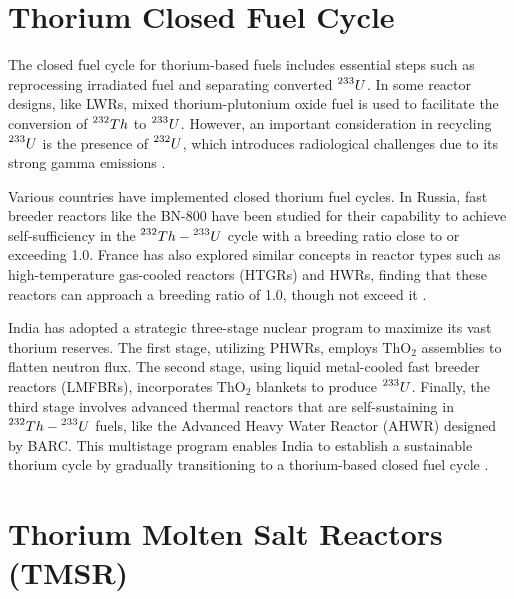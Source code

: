 \section{Thorium Closed Fuel Cycle}

The closed fuel cycle for thorium-based fuels includes essential steps such as reprocessing irradiated fuel and separating converted \(\prescript{233}{}{U}\). In some reactor designs, like LWRs, mixed thorium-plutonium oxide fuel is used to facilitate the conversion of \(\prescript{232}{}{Th}\) to \(\prescript{233}{}{U}\). However, an important consideration in recycling \(\prescript{233}{}{U}\) is the presence of \(\prescript{232}{}{U}\), which introduces radiological challenges due to its strong gamma emissions \cite{IAEA_Th_Potential}.

Various countries have implemented closed thorium fuel cycles. In Russia, fast breeder reactors like the BN-800 have been studied for their capability to achieve self-sufficiency in the \(\prescript{232}{}{Th}-\prescript{233}{}{U}\) cycle with a breeding ratio close to or exceeding 1.0. France has also explored similar concepts in reactor types such as high-temperature gas-cooled reactors (HTGRs) and HWRs, finding that these reactors can approach a breeding ratio of 1.0, though not exceed it \cite{IAEA_Th_Potential}.

India has adopted a strategic three-stage nuclear program to maximize its vast thorium reserves. The first stage, utilizing PHWRs, employs \(\text{ThO}_2\) assemblies to flatten neutron flux. The second stage, using liquid metal-cooled fast breeder reactors (LMFBRs), incorporates \(\text{ThO}_2\) blankets to produce \(\prescript{233}{}{U}\). Finally, the third stage involves advanced thermal reactors that are self-sustaining in \(\prescript{232}{}{Th}-\prescript{233}{}{U}\) fuels, like the Advanced Heavy Water Reactor (AHWR) designed by BARC. This multistage program enables India to establish a sustainable thorium cycle by gradually transitioning to a thorium-based closed fuel cycle \cite{IAEA_Th_Potential}.

\section{Thorium Molten Salt Reactors (TMSR)}